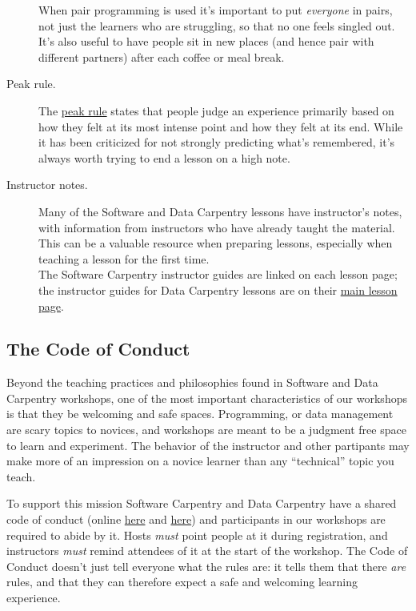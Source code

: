 \begin{description}
When pair programming is used it's important to put \emph{everyone} in
pairs, not just the learners who are struggling, so that no one feels
singled out. It's also useful to have people sit in new places (and
hence pair with different partners) after each coffee or meal break.
\item[Peak rule.]
The \href{https://en.wikipedia.org/wiki/Peak\%E2\%80\%93end_rule}{peak
rule} states that people judge an experience primarily based on how they
felt at its most intense point and how they felt at its end. While it
has been criticized for not strongly predicting what's remembered, it's
always worth trying to end a lesson on a high note.
\item[Instructor notes.]
Many of the Software and Data Carpentry lessons have instructor's notes,
with information from instructors who have already taught the material.
This can be a valuable resource when preparing lessons, especially when
teaching a lesson for the first time.\\The Software Carpentry instructor
guides are linked on each lesson page; the instructor guides for Data
Carpentry lessons are on their
\href{\{\{\%20site.dc_site\%20\}\}/lessons/}{main lesson page}.
\end{description}

\subsection{The Code of Conduct}\label{the-code-of-conduct}

Beyond the teaching practices and philosophies found in Software and
Data Carpentry workshops, one of the most important characteristics of
our workshops is that they be welcoming and safe spaces. Programming, or
data management are scary topics to novices, and workshops are meant to
be a judgment free space to learn and experiment. The behavior of the
instructor and other partipants may make more of an impression on a
novice learner than any ``technical'' topic you teach.

To support this mission Software Carpentry and Data Carpentry have a
shared code of conduct (online
\href{\{\{\%20site.swc_site\%20\}\}/conduct/}{here} and
\href{\{\{\%20site.dc_site\%20\}\}/code-of-conduct/}{here}) and
participants in our workshops are required to abide by it. Hosts
\emph{must} point people at it during registration, and instructors
\emph{must} remind attendees of it at the start of the workshop. The
Code of Conduct doesn't just tell everyone what the rules are: it tells
them that there \emph{are} rules, and that they can therefore expect a
safe and welcoming learning experience.

